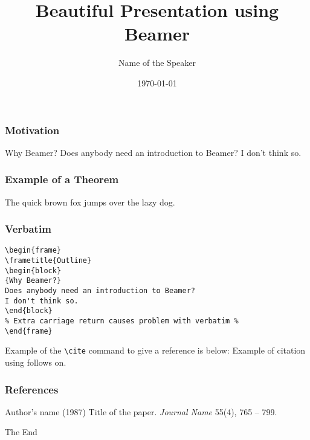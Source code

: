 \documentclass{beamer}
\title[\iscam]{Beautiful Presentation using Beamer}
\author{Name of the Speaker}
\institute[U of X]
{
University of [...] \\
\medskip
{\emph{email@domain.ca}}
}
\date{\today}
\begin{document}
%
\begin{frame}
\titlepage
\end{frame}
%
\begin{frame}
\frametitle{Motivation}
\begin{block}
{Why Beamer?}
Does anybody need an introduction to Beamer? I don't think so.
\end{block}
\end{frame}
%
\begin{frame}
\frametitle{Example of a Theorem}
\begin{theorem}
The quick brown fox jumps over the lazy dog.
\end{theorem}
\end{frame}
%
\begin{frame}[fragile] %
\frametitle{Verbatim}
\begin{example}
\begin{verbatim}
\begin{frame}
\frametitle{Outline}
\begin{block}
{Why Beamer?}
Does anybody need an introduction to Beamer?
I don't think so.
\end{block}
% Extra carriage return causes problem with verbatim %
\end{frame}\end{verbatim} 
\end{example}
\end{frame}
 
\begin{frame}[fragile]  %
Example of the \verb|\cite| command to give a reference is below:
Example of citation using \cite{key1} follows on.
\end{frame}
 
\begin{frame}
\frametitle{References}
\footnotesize{
\begin{thebibliography}{99}
  Author's name (1987)
 \newblock Title of the paper.
 \newblock \emph{Journal Name} 55(4), 765 -- 799.
\end{thebibliography}
}
\end{frame}
 
\begin{frame}
\centerline{The End}
\end{frame}
\end{document}

